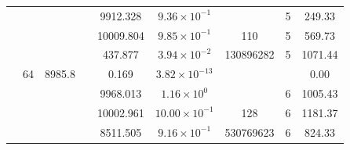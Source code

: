 \begin{table}[htbp]
\begin{tabular}{l S[table-format=3.0] S[table-format=4.1] l S[table-format=3.3] S[table-format=1.2e2] S[table-format=6.0] S[table-format=2.0] S[table-format=4.2]}
     &  &  &  & 9912.328 & $9.36 \times 10^{-1}$ & {\text{---}} & 5 & 249.33 \\
     &  &  &  & 10009.804 & $9.85 \times 10^{-1}$ & 110 & 5 & 569.73 \\
     &  &  &  & 437.877 & $3.94 \times 10^{-2}$ & 130896282 & 5 & 1071.44 \\
     & 64 & 8985.8 &  & 0.169 & $3.82 \times 10^{-13}$ & {\text{---}} & {\text{---}} & 0.00 \\
     &  &  &  & 9968.013 & $1.16 \times 10^{0}$ & {\text{---}} & 6 & 1005.43 \\
     &  &  &  & 10002.961 & $10.00 \times 10^{-1}$ & 128 & 6 & 1181.37 \\
     &  &  &  & 8511.505 & $9.16 \times 10^{-1}$ & 530769623 & 6 & 824.33 \\
    \bottomrule
  \end{tabular}
\end{table}
